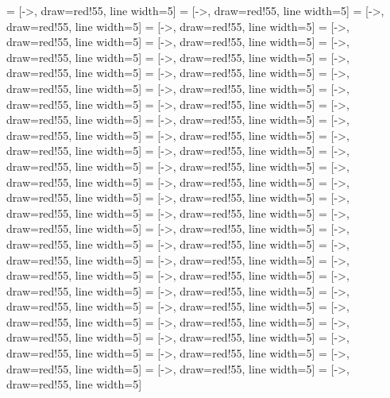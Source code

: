 = [->, draw=red!55, line width=5]
 = [->, draw=red!55, line width=5]
 = [->, draw=red!55, line width=5]
 = [->, draw=red!55, line width=5]
 = [->, draw=red!55, line width=5]
 = [->, draw=red!55, line width=5]
 = [->, draw=red!55, line width=5]
 = [->, draw=red!55, line width=5]
 = [->, draw=red!55, line width=5]
 = [->, draw=red!55, line width=5]
 = [->, draw=red!55, line width=5]
 = [->, draw=red!55, line width=5]
 = [->, draw=red!55, line width=5]
 = [->, draw=red!55, line width=5]
 = [->, draw=red!55, line width=5]
 = [->, draw=red!55, line width=5]
 = [->, draw=red!55, line width=5]
 = [->, draw=red!55, line width=5]
 = [->, draw=red!55, line width=5]
 = [->, draw=red!55, line width=5]
 = [->, draw=red!55, line width=5]
 = [->, draw=red!55, line width=5]
 = [->, draw=red!55, line width=5]
 = [->, draw=red!55, line width=5]
 = [->, draw=red!55, line width=5]
 = [->, draw=red!55, line width=5]
 = [->, draw=red!55, line width=5]
 = [->, draw=red!55, line width=5]
 = [->, draw=red!55, line width=5]
 = [->, draw=red!55, line width=5]
 = [->, draw=red!55, line width=5]
 = [->, draw=red!55, line width=5]
 = [->, draw=red!55, line width=5]
 = [->, draw=red!55, line width=5]
 = [->, draw=red!55, line width=5]
 = [->, draw=red!55, line width=5]
 = [->, draw=red!55, line width=5]
 = [->, draw=red!55, line width=5]
 = [->, draw=red!55, line width=5]
 = [->, draw=red!55, line width=5]
 = [->, draw=red!55, line width=5]
 = [->, draw=red!55, line width=5]
 = [->, draw=red!55, line width=5]
 = [->, draw=red!55, line width=5]
 = [->, draw=red!55, line width=5]
 = [->, draw=red!55, line width=5]
 = [->, draw=red!55, line width=5]
 = [->, draw=red!55, line width=5]
 = [->, draw=red!55, line width=5]
